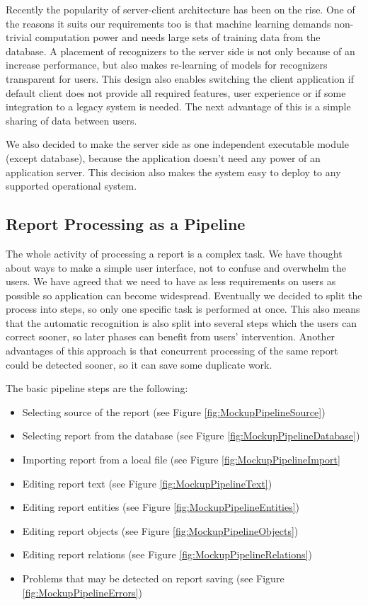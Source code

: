 Recently the popularity of server-client architecture has been on the rise.
One of the reasons it suits our requirements too is that machine learning demands non-trivial
computation power and needs large sets of training data from the database. A placement of recognizers
to the server side is not only because of an increase performance, but also makes
re-learning of models for recognizers transparent for users. This design also enables
switching the client application if default \textan{} client does not provide all
required features, user experience or if some integration to a legacy system is needed.
The next advantage of this is a simple sharing of data between users.

We also decided to make the server side as one independent executable module (except database),
because the application doesn't need any power of an application server. This decision
also makes the system easy to deploy to any supported operational system.

\subsection{Report Processing as a Pipeline}
\label{ssec:ReportPipeline}

The whole activity of processing a report is a complex task. We have thought
about ways to make a simple user interface, not to confuse and overwhelm the users.
We have agreed that we need to have as less requirements on users as possible
so application can become widespread. Eventually we decided to split the
process into steps, so only one specific task is performed at once. This also
means that the automatic recognition is also split into several steps which the
users can correct sooner, so later phases can benefit from users' intervention.
Another advantages of this approach is that concurrent processing of the same
report could be detected sooner, so it can save some duplicate work.

The basic pipeline steps are the following:
\begin{itemize}
	\item Selecting source of the report (see Figure \ref{fig:MockupPipelineSource})
	\item Selecting report from the database (see Figure \ref{fig:MockupPipelineDatabase})
	\item Importing report from a local file (see Figure \ref{fig:MockupPipelineImport}
	\item Editing report text (see Figure \ref{fig:MockupPipelineText})
	\item Editing report entities (see Figure \ref{fig:MockupPipelineEntities})
	\item Editing report objects (see Figure \ref{fig:MockupPipelineObjects})
	\item Editing report relations (see Figure \ref{fig:MockupPipelineRelations})
	\item Problems that may be detected on report saving (see Figure \ref{fig:MockupPipelineErrors})
\end{itemize}

